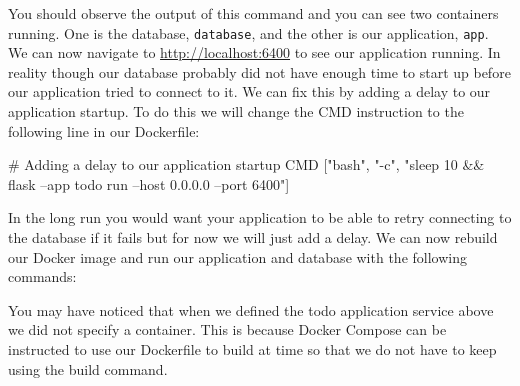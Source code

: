 \documentclass{csse4400}
\begin{document}
You should observe the output of this command and you can see two containers running.
One is the database, \texttt{database}, and the other is our application, \texttt{app}.
We can now navigate to \url{http://localhost:6400} to see our application running.
In reality though our database probably did not have enough time to start up before our application tried to connect to it.
We can fix this by adding a delay to our application startup.
To do this we will change the CMD instruction to the following line in our Dockerfile:

\begin{code}[language=docker,numbers=none]{}
# Adding a delay to our application startup
CMD ["bash", "-c", "sleep 10 && flask --app todo run --host 0.0.0.0 --port 6400"]
\end{code}

In the long run you would want your application to be able to retry connecting to the database if it fails but for now we will just add a delay.
We can now rebuild our Docker image and run our application and database with the following commands:


You may have noticed that when we defined the todo application service above we did not specify a container.
This is because Docker Compose can be instructed to use our Dockerfile to build at time so that we do not have to keep using the build command.






\end{document}
